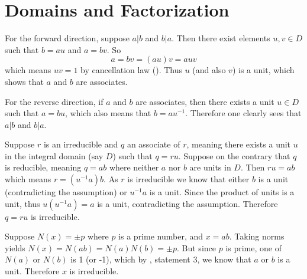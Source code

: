 \section{Domains and Factorization}
\begin{questions}
    \item For the forward direction, suppose $a \vert b$ and $b \vert a$. Then there exist elements $u, v \in D$ such that $b = au$ and $a = bv$. So
    \[
        a = bv = (au)v = auv
    \]
    which means $uv = 1$ by cancellation law (). Thus $u$ (and also $v$) is a unit, which shows that $a$ and $b$ are associates.
    
    For the reverse direction, if $a$ and $b$ are associates, then there exists a unit $u \in D$ such that $a = bu$, which also means that $b = au^{-1}$. Therefore one clearly sees that $a \vert b$ and $b \vert a$.

    \item Suppose $r$ is an irreducible and $q$ an associate of $r$, meaning there exists a unit $u$ in the integral domain (say $D$) such that $q = ru$. Suppose on the contrary that $q$ is reducible, meaning $q = ab$ where neither $a$ nor $b$ are units in $D$. Then $ru = ab$ which means $r = (u^{-1}a)b$. As $r$ is irreducible we know that either $b$ is a unit (contradicting the assumption) or $u^{-1}a$ is a unit. Since the product of units is a unit, thus $u(u^{-1}a) = a$ is a unit, contradicting the assumption. Therefore $q = ru$ is irreducible.
    
    \item %

    \item Suppose $N(x) = \pm p$ where $p$ is a prime number, and $x = ab$. Taking norms yields $N(x) = N(ab) = N(a)N(b) = \pm p$. But since $p$ is prime, one of $N(a)$ or $N(b)$ is 1 (or -1), which by , statement 3, we know that $a$ or $b$ is a unit. Therefore $x$ is irreducible.
\end{questions}
